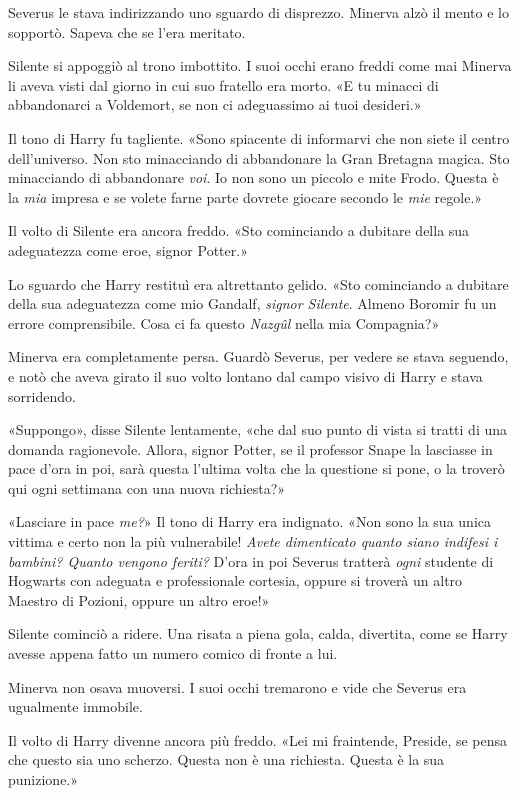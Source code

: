 Severus le stava indirizzando uno sguardo di disprezzo. Minerva alzò il mento e lo sopportò. Sapeva che se l’era meritato.

Silente si appoggiò al trono imbottito. I suoi occhi erano freddi come mai Minerva li aveva visti dal giorno in cui suo fratello era morto. «E tu minacci di abbandonarci a Voldemort, se non ci adeguassimo ai tuoi desideri.»

Il tono di Harry fu tagliente. «Sono spiacente di informarvi che non siete il centro dell’universo. Non sto minacciando di abbandonare la Gran Bretagna magica. Sto minacciando di abbandonare \textit{voi}. Io non sono un piccolo e mite Frodo. Questa è la \textit{mia} impresa e se volete farne parte dovrete giocare secondo le \textit{mie} regole.»

Il volto di Silente era ancora freddo. «Sto cominciando a dubitare della sua adeguatezza come eroe, signor Potter.»

Lo sguardo che Harry restituì era altrettanto gelido. «Sto cominciando a dubitare della sua adeguatezza come mio Gandalf, \textit{signor Silente}. Almeno Boromir fu un errore comprensibile. Cosa ci fa questo \textit{Nazgûl} nella mia Compagnia?»

Minerva era completamente persa. Guardò Severus, per vedere se stava seguendo, e notò che aveva girato il suo volto lontano dal campo visivo di Harry e stava sorridendo.

«Suppongo», disse Silente lentamente, «che dal suo punto di vista si tratti di una domanda ragionevole. Allora, signor Potter, se il professor Snape la lasciasse in pace d’ora in poi, sarà questa l’ultima volta che la questione si pone, o la troverò qui ogni settimana con una nuova richiesta?»

«Lasciare in pace \textit{me?}» Il tono di Harry era indignato. «Non sono la sua unica vittima e certo non la più vulnerabile! \textit{Avete dimenticato quanto siano indifesi i bambini? Quanto vengono feriti?} D’ora in poi Severus tratterà \textit{ogni} studente di Hogwarts con adeguata e professionale cortesia, oppure si troverà un altro Maestro di Pozioni, oppure un altro eroe!»

Silente cominciò a ridere. Una risata a piena gola, calda, divertita, come se Harry avesse appena fatto un numero comico di fronte a lui.

Minerva non osava muoversi. I suoi occhi tremarono e vide che Severus era ugualmente immobile.

Il volto di Harry divenne ancora più freddo. «Lei mi fraintende, Preside, se pensa che questo sia uno scherzo. Questa non è una richiesta. Questa è la sua punizione.»

